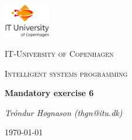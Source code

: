 
\begin{titlepage}
	\centering
	\includegraphics[width=0.15\textwidth]{logo}\par\vspace{1cm}
	{\scshape\LARGE IT-University of Copenhagen \par}
	\vspace{1cm}
	{\scshape\Large Intelligent systems programming\par}
	\vspace{1.5cm}
	{\huge\bfseries Mandatory exercise 6\par}
	\vspace{2cm}
	{\Large\itshape Tróndur Høgnason (thgn@itu.dk)\par}
\vspace{\fill}
	{\large \today\par}
\end{titlepage}